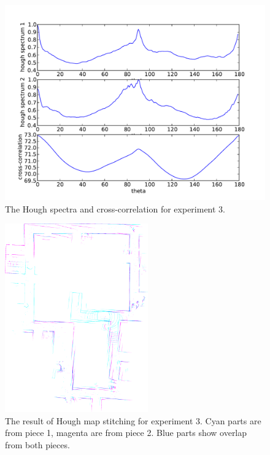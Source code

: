 \begin{figure}[ht]
\centering
  \includegraphics[width=\textwidth]{images/experiment/map4/hough.pdf}
  \caption{The Hough spectra and cross-correlation for experiment 3.}
  \label{fig:map4-hough}
\end{figure}

\begin{figure}[ht]
\centering
  \includegraphics[width=0.55\textwidth]{images/experiment/map4/results/result_color_0.png}
  \caption{The result of Hough map stitching for experiment 3. Cyan parts are from piece 1, magenta are from piece 2. Blue parts show overlap from both pieces.}
  \label{fig:map4-result}
\end{figure}

